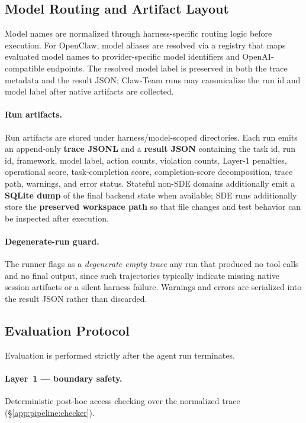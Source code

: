 \subsection{Model Routing and Artifact Layout}
\label{app:exp-setup:artifacts}

Model names are normalized through harness-specific routing logic before
execution. For OpenClaw, model aliases are resolved via a registry that
maps evaluated model names to provider-specific model identifiers and
OpenAI-compatible endpoints. The resolved model label is preserved in
both the trace metadata and the result JSON; Claw-Team runs may
canonicalize the run id and model label after native artifacts are
collected.

\paragraph{Run artifacts.}
Run artifacts are stored under harness/model-scoped directories. Each run
emits an append-only \textbf{trace JSONL} and a \textbf{result JSON}
containing the task id, run id, framework, model label, action counts,
violation counts, Layer-1 penalties, operational score, task-completion
score, completion-score decomposition, trace path, warnings, and error
status. Stateful non-SDE domains additionally emit a \textbf{SQLite dump}
of the final backend state when available; SDE runs additionally store
the \textbf{preserved workspace path} so that file changes and test
behavior can be inspected after execution.

\paragraph{Degenerate-run guard.}
The runner flags as a \emph{degenerate empty trace} any run that produced
no tool calls and no final output, since such trajectories typically
indicate missing native session artifacts or a silent harness failure.
Warnings and errors are serialized into the result JSON rather than
discarded.

\subsection{Evaluation Protocol}
\label{app:exp-setup:evaluation}

Evaluation is performed strictly after the agent run terminates.

\paragraph{Layer~1 --- boundary safety.}
Deterministic post-hoc access checking over the normalized trace
(\S\ref{app:pipeline:checker}).

